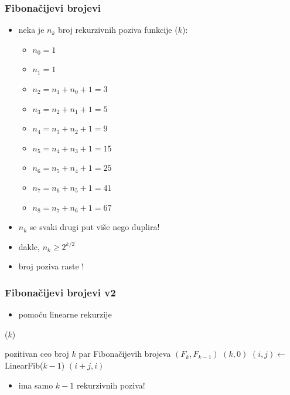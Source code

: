 \documentclass[compress]{beamer}
\begin{document}
\begin{frame}[fragile]
  \frametitle{Fibonačijevi brojevi}
\begin{itemize}
  \item neka je $n_k$ broj rekurzivnih poziva funkcije ($k$):
  \begin{itemize}
    \item $n_0 = 1$
    \item $n_1 = 1$
    \item $n_2 = n_1 + n_0 + 1 = 3$
    \item $n_3 = n_2 + n_1 + 1 = 5$
    \item $n_4 = n_3 + n_2 + 1 = 9$
    \item $n_5 = n_4 + n_3 + 1 = 15$
    \item $n_6 = n_5 + n_4 + 1 = 25$
    \item $n_7 = n_6 + n_5 + 1 = 41$
    \item $n_8 = n_7 + n_6 + 1 = 67$
  \end{itemize}
  \item $n_k$ se svaki drugi put više nego duplira!
  \item dakle, $n_k \geq 2^{k/2}$
  \item broj poziva raste !
\end{itemize}
\end{frame}

\begin{frame}[fragile]
  \frametitle{Fibonačijevi brojevi v2}
\begin{itemize}
  \item pomoću linearne rekurzije
\end{itemize}
($k$)
\begin{algorithmic}
\REQUIRE pozitivan ceo broj $k$
\ENSURE par Fibonačijevih brojeva $(F_k, F_{k-1})$
  \RETURN $(k, 0)$
\ELSE
  \STATE $(i, j) \leftarrow$ LinearFib($k-1$)
  \RETURN $(i+j, i)$
\ENDIF
\end{algorithmic}
\begin{itemize}
  \item ima samo $k-1$ rekurzivnih poziva!
\end{itemize}
\end{frame}
\end{document}
